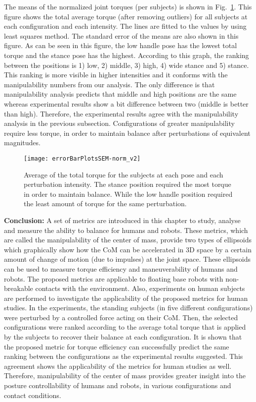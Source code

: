 The means of the normalized joint torques (per subjects) is shown in
Fig.~\ref{jointtorque}.  This figure shows the total average torque (after
removing outliers) for all subjects at each configuration and each intensity.
The lines are fitted to the values by using least squares method.  The
standard error of the means are also shown in this figure.  As can be seen in
this figure, the low handle pose has the lowest total torque and the stance
pose has the highest.  According to this graph, the ranking between the
positions is 1) low, 2) middle, 3) high, 4) wide stance and 5) stance.  This
ranking is more visible in higher intensities and it conforms with the
manipulability numbers from our analysis.  The only difference is that
manipulability analysis predicts that middle and high positions are the same
whereas experimental results show a bit difference between two (middle is
better than high).  Therefore, the experimental results agree with the
manipulability analysis in the previous subsection.  Configurations of greater
manipulability require less torque, in order to maintain balance after
perturbations of equivalent magnitudes.
\begin{figure}
	\centering \texttt{[image: errorBarPlotsSEM-norm\_v2]}
	\caption{Average of the total torque for the subjects at each pose and each
		perturbation intensity.  The stance position required the most torque in
		order to maintain balance.  While the low handle position required the
		least amount of torque for the same perturbation.}
	\label{jointtorque}
\end{figure}


\textbf{Conclusion:} A set of metrics are introduced in this chapter to study, analyse and measure
the ability to balance for humans and robots.  These metrics, which are called
the manipulability of the center of mass, provide two types of ellipsoids
which graphically show how the CoM can be accelerated in 3D space by a certain
amount of change of motion (due to impulses) at the joint space.  These
ellipsoids can be used to measure torque efficiency and maneuverability of
humans and robots.  The proposed metrics are applicable to floating base
robots with non-breakable contacts with the environment.  Also, experiments on
human subjects are performed to investigate the applicability of the proposed
metrics for human studies.  In the experiments, the standing subjects (in five
different configurations) were perturbed by a controlled force acting on their
CoM.  Then, the selected configurations were ranked according to the average
total torque that is applied by the subjects to recover their balance at each
configuration.  It is shown that the proposed metric for torque efficiency can
successfully predict the same ranking between the configurations as the
experimental results suggested.  This agreement shows the applicability of the
metrics for human studies as well.  Therefore, manipulability of the center of
mass provides greater insight into the posture controllability of humans and
robots, in various configurations and contact conditions.